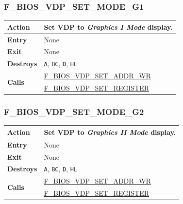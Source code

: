\documentclass[a4paper,11pt]{article}
\begin{document}
        \subsubsection{F\_BIOS\_VDP\_SET\_MODE\_G1}
        \label{func:fbiosvdpsetmodeg1}
        \begin{tabular}{l p{9cm}}
            \hline\textbf{Action}
            & Set \textbf{VDP} to \textit{Graphics I Mode} display.\\
            \hline\textbf{Entry} & None\\
            \hline\textbf{Exit} & None\\
            \hline\textbf{Destroys} & \texttt{A}, \texttt{BC}, \texttt{D},
            \texttt{HL} \\
            \hline\multirow[t]{2}{4em}{\textbf{Calls}}
            & \hyperref[func:fbiosvdpsetaddrwr]{F\_BIOS\_VDP\_SET\_ADDR\_WR}\\
            & \hyperref[func:fbiosvdpsetregister]{F\_BIOS\_VDP\_SET\_REGISTER}\\
            \hline
        \end{tabular}

        \subsubsection{F\_BIOS\_VDP\_SET\_MODE\_G2}
        \label{func:fbiosvdpsetmodeg2}
        \begin{tabular}{l p{9cm}}
            \hline\textbf{Action}
            & Set \textbf{VDP} to \textit{Graphics II Mode} display.\\
            \hline\textbf{Entry} & None\\
            \hline\textbf{Exit} & None\\
            \hline\textbf{Destroys} & \texttt{A}, \texttt{BC}, \texttt{D},
            \texttt{HL} \\
            \hline\multirow[t]{2}{4em}{\textbf{Calls}}
            & \hyperref[func:fbiosvdpsetaddrwr]{F\_BIOS\_VDP\_SET\_ADDR\_WR}\\
            & \hyperref[func:fbiosvdpsetregister]{F\_BIOS\_VDP\_SET\_REGISTER}\\
            \hline
        \end{tabular}
\end{document}
